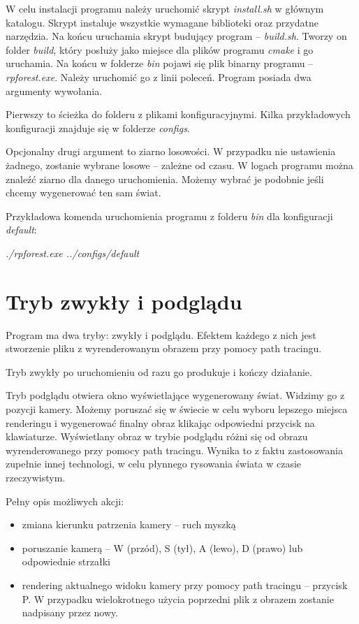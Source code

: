 \documentclass[inz,shortabstract]{iithesis}
\begin{document}
        
        W celu instalacji programu należy uruchomić skrypt \textit{install.sh} w głównym katalogu. Skrypt instaluje wszystkie wymagane biblioteki oraz przydatne narzędzia. Na końcu uruchamia skrypt budujący program -- \textit{build.sh}. Tworzy on folder \textit{build}, który posłuży jako miejsce dla plików programu \textit{cmake} i go uruchamia. Na końcu w folderze \textit{bin} pojawi się plik binarny programu -- \textit{rpforest.exe}. Należy uruchomić go z linii poleceń. Program posiada dwa argumenty wywołania. 
        
        Pierwszy to ścieżka do folderu z plikami konfiguracyjnymi. Kilka przykładowych konfiguracji znajduje się w folderze \textit{configs}.
        
        Opcjonalny drugi argument to ziarno losowości. W przypadku nie ustawienia żadnego, zostanie wybrane losowe -- zależne od czasu. W logach programu można znaleźć ziarno dla danego uruchomienia. Możemy wybrać je podobnie jeśli chcemy wygenerować ten sam świat. 
    
        Przykładowa komenda uruchomienia programu z folderu \textit{bin} dla konfiguracji \textit{default}: 
        \begin{description}
            \item \textit{./rpforest.exe ../configs/default} 
        \end{description}
        
        
    \section{Tryb zwykły i podglądu}
        Program ma dwa tryby: zwykły i podglądu. Efektem każdego z nich jest stworzenie pliku z wyrenderowanym obrazem przy pomocy path tracingu.
        
        Tryb zwykły po uruchomieniu od razu go produkuje i kończy działanie. 
        
        Tryb podglądu otwiera okno wyświetlające wygenerowany świat. Widzimy go z pozycji kamery. Możemy poruszać się w świecie w celu wyboru lepszego miejsca renderingu i wygenerować finalny obraz klikając odpowiedni przycisk na klawiaturze. Wyświetlany obraz w trybie podglądu różni się od obrazu wyrenderowanego przy pomocy path tracingu. Wynika to z faktu zastosowania zupełnie innej technologi, w celu płynnego rysowania świata w czasie rzeczywistym.
        
        Pełny opis możliwych akcji:
        \begin{itemize}
            \item zmiana kierunku patrzenia kamery -- ruch myszką
            \item poruszanie kamerą -- W (przód), S (tył), A (lewo), D (prawo) lub odpowiednie strzałki
            \item rendering aktualnego widoku kamery przy pomocy path tracingu -- przycisk P. W przypadku wielokrotnego użycia poprzedni plik z obrazem zostanie nadpisany przez nowy.
        \end{itemize}
        
\end{document}
